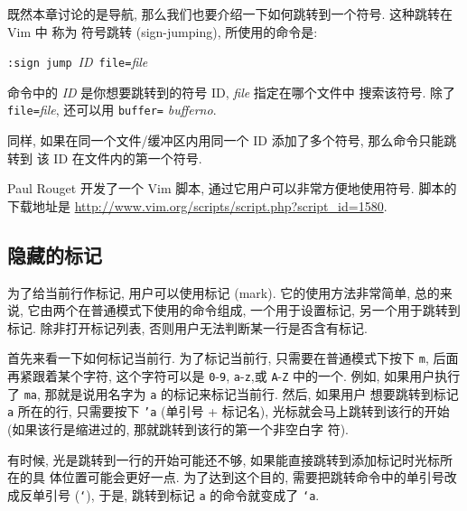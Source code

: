 \begin{vimcode}
既然本章讨论的是导航, 那么我们也要介绍一下如何跳转到一个符号. 这种跳转在 Vim 中
称为 符号跳转 (sign-jumping), 所使用的命令是:
\begin{vimcmdform}
\texttt{:sign jump}\ \textit{ID}\ \texttt{file=}\textit{file}
\end{vimcmdform}
命令中的 \textit{ID} 是你想要跳转到的符号 ID, \textit{file} 指定在哪个文件中
搜索该符号. 除了 \texttt{file=}\textit{file}, 还可以用 \texttt{buffer=}%
\textit{bufferno}.

同样, 如果在同一个文件/缓冲区内用同一个 ID 添加了多个符号, 那么命令只能跳转到
该 ID 在文件内的第一个符号.

\begin{warning}
    Paul Rouget 开发了一个 Vim 脚本, 通过它用户可以非常方便地使用符号. 脚本的
    下载地址是 \url{http://www.vim.org/scripts/script.php?script_id=1580}.
\end{warning}

\subsection{隐藏的标记}
\label{subsec:hidden_markers_using_marks}

为了给当前行作标记, 用户可以使用标记 (mark). 它的使用方法非常简单, 总的来说,
它由两个在普通模式下使用的命令组成, 一个用于设置标记, 另一个用于跳转到标记.
除非打开标记列表, 否则用户无法判断某一行是否含有标记.

首先来看一下如何标记当前行. 为了标记当前行, 只需要在普通模式下按下
\texttt{m}, 后面再紧跟着某个字符, 这个字符可以是 \texttt{0}-\texttt{9},
\texttt{a}-\texttt{z},或 \texttt{A}-\texttt{Z} 中的一个. 例如, 如果用户执行
了 \texttt{ma}, 那就是说用名字为 \texttt{a} 的标记来标记当前行. 然后, 如果用户
想要跳转到标记 \texttt{a} 所在的行, 只需要按下 \texttt{'a} (单引号 + 标记名),
光标就会马上跳转到该行的开始 (如果该行是缩进过的, 那就跳转到该行的第一个非空白字
符).

有时候, 光是跳转到一行的开始可能还不够, 如果能直接跳转到添加标记时光标所在的具
体位置可能会更好一点. 为了达到这个目的, 需要把跳转命令中的单引号改成反单引号
(\texttt{`}), 于是, 跳转到标记 \texttt{a} 的命令就变成了 \texttt{`a}.


\end{vimcode}
